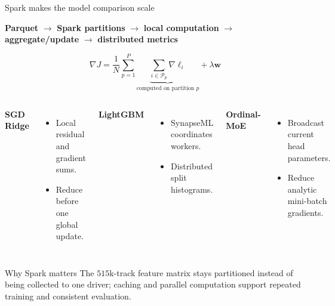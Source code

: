 \begin{frame}{Spark makes the model comparison scale}

\small

\begin{center}
\textbf{Parquet} $\longrightarrow$
\textbf{Spark partitions} $\longrightarrow$
\textbf{local computation} $\longrightarrow$
\textbf{aggregate/update} $\longrightarrow$
\textbf{distributed metrics}
\end{center}

\[
\nabla J =
\frac{1}{N}\sum_{p=1}^{P}
\underbrace{\sum_{i\in\mathcal P_p}\nabla\ell_i}_{\text{computed on partition }p}
+\lambda\mathbf{w}
\]

\begin{columns}[T,onlytextwidth]
	\small
	\textbf{SGD Ridge}
	\begin{itemize}
		\setlength{\itemsep}{2pt}
		\item Local residual and gradient sums.
		\item Reduce before one global update.
	\end{itemize}

	\textbf{LightGBM}
	\begin{itemize}
		\setlength{\itemsep}{2pt}
		\item SynapseML coordinates workers.
		\item Distributed split histograms.
	\end{itemize}

	\textbf{Ordinal-MoE}
	\begin{itemize}
		\setlength{\itemsep}{2pt}
		\item Broadcast current head parameters.
		\item Reduce analytic mini-batch gradients.
	\end{itemize}
\end{columns}

\smallskip
\begin{block}{Why Spark matters}
The $515$k-track feature matrix stays partitioned instead of being collected
to one driver; caching and parallel computation support repeated training and
consistent evaluation.~{\scriptsize\autocite{zaharia2012rdd}}
\end{block}

\end{frame}
